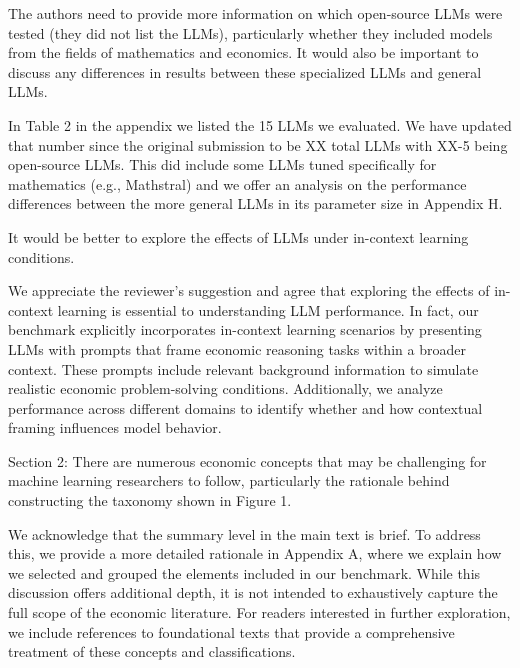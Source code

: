 \documentclass[12pt]{rebuttal_style}
\begin{document}
\begin{revcomment}
    The authors need to provide more information on which open-source LLMs were tested (they did not list the LLMs), particularly whether they included models from the fields of mathematics and economics. It would also be important to discuss any differences in results between these specialized LLMs and general LLMs.
\end{revcomment}
\begin{response}
    In Table 2 in the appendix we listed the 15 LLMs we evaluated. We have updated that number since the original submission to be XX total LLMs with XX-5 being open-source LLMs. This did include some LLMs tuned specifically for mathematics (e.g., Mathstral) and we offer an analysis on the performance differences between the more general LLMs in its parameter size in Appendix H.
\end{response}

\begin{revcomment}
    It would be better to explore the effects of LLMs under in-context learning conditions.
\end{revcomment}
\begin{response}
    We appreciate the reviewer's suggestion and agree that exploring the effects of in-context learning is essential to understanding LLM performance. In fact, our benchmark explicitly incorporates in-context learning scenarios by presenting LLMs with prompts that frame economic reasoning tasks within a broader context. These prompts include relevant background information to simulate realistic economic problem-solving conditions. Additionally, we analyze performance across different domains to identify whether and how contextual framing influences model behavior.
\end{response}

\nextreviewer

\begin{revcomment}
    Section 2: There are numerous economic concepts that may be challenging for machine learning researchers to follow, particularly the rationale behind constructing the taxonomy shown in Figure 1.
\end{revcomment}
\begin{response}
    We acknowledge that the summary level in the main text is brief. To address this, we provide a more detailed rationale in Appendix A, where we explain how we selected and grouped the elements included in our benchmark. While this discussion offers additional depth, it is not intended to exhaustively capture the full scope of the economic literature. For readers interested in further exploration, we include references to foundational texts that provide a comprehensive treatment of these concepts and classifications.
\end{response}
\end{document}
